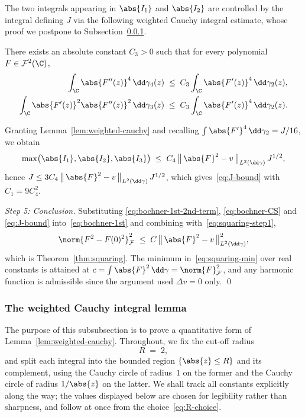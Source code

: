 \medskip

The two integrals appearing in $\abs{I_1}$ and $\abs{I_2}$ are controlled
by the integral defining $J$ via the following weighted Cauchy integral
estimate, whose proof we postpone to Subsection~\ref{sec:weighted-cauchy}.

\begin{lemma}\label{lem:weighted-cauchy}
There exists an absolute constant $C_3 > 0$ such that for every polynomial
$F \in \mathcal{F}^2(\C)$,
\begin{align}
\int_{\C} \abs{F''(z)}^4\, \dd\gamma_4(z)
&\;\le\; C_3 \int_{\C} \abs{F'(z)}^4\, \dd\gamma_2(z),
\label{eq:cauchy-l4}\\
\int_{\C} \abs{F'(z)}^2\abs{F''(z)}^2\, \dd\gamma_3(z)
&\;\le\; C_3 \int_{\C} \abs{F'(z)}^4\, \dd\gamma_2(z).
\label{eq:cauchy-mixed}
\end{align}
\end{lemma}

Granting Lemma~\ref{lem:weighted-cauchy} and recalling $\int\abs{F'}^4
\,\dd\gamma_2 = J/16$, we obtain
\[
\max\bigl(\abs{I_1},\abs{I_2},\abs{I_3}\bigr)
\;\le\;
C_4\,\bigl\|\,\abs{F}^2 - v\,\bigr\|_{L^2(\dd\gamma)}\, J^{1/2},
\]
hence $J \le 3 C_4\,\bigl\|\,\abs{F}^2-v\,\bigr\|_{L^2(\dd\gamma)}\,
J^{1/2}$, which gives~\eqref{eq:J-bound} with $C_1 = 9 C_4^2$.

\medskip
\noindent\emph{Step 5: Conclusion.}\;
Substituting \eqref{eq:bochner-1st-2nd-term},
\eqref{eq:bochner-CS} and \eqref{eq:J-bound}
into~\eqref{eq:bochner-1st} and combining with~\eqref{eq:squaring-step1},
\[
\norm{F^2 - F(0)^2}_{\mathcal{F}}^2
\;\le\;
C\,\bigl\|\,\abs{F}^2 - v\,\bigr\|_{L^2(\dd\gamma)}^2,
\]
which is Theorem~\ref{thm:squaring}. The minimum
in~\eqref{eq:squaring-min} over real constants is attained at
$c = \int\abs{F}^2\,\dd\gamma = \norm{F}_{\mathcal{F}}^2$, and any harmonic
function is admissible since the argument used $\Delta v = 0$ only.
\qed

\subsubsection{The weighted Cauchy integral lemma}\label{sec:weighted-cauchy}

The purpose of this subsubsection is to prove a quantitative form of
Lemma~\ref{lem:weighted-cauchy}. Throughout, we fix the cut-off radius
\begin{equation}\label{eq:R-choice}
R \;=\; 2,
\end{equation}
and split each integral into the bounded region $\{\abs{z}\le R\}$ and
its complement, using the Cauchy circle of radius~$1$ on the former
and the Cauchy circle of radius $1/\abs{z}$ on the latter.  We
shall track all constants explicitly along the way; the values
displayed below are chosen for legibility rather than sharpness, and
follow at once from the choice~\eqref{eq:R-choice}.

